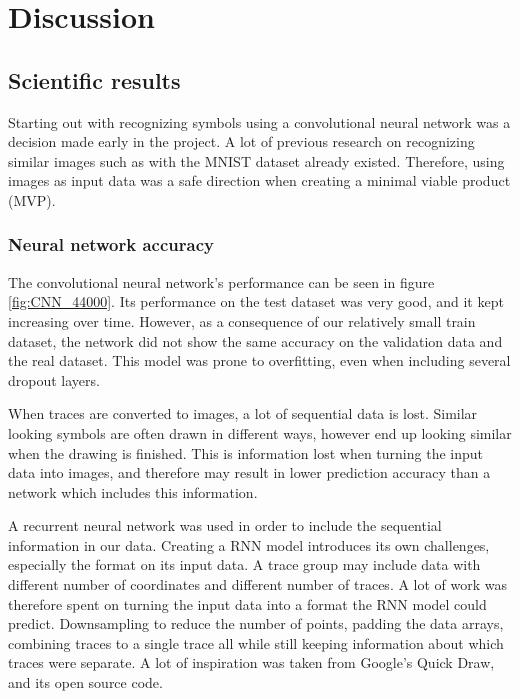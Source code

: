 \chapter{Discussion}

\section{Scientific results}

Starting out with recognizing symbols using a convolutional neural network was a decision made early in the project. A lot of previous research on recognizing similar images such as with the MNIST dataset already existed. Therefore, using images as input data was a safe direction when creating a minimal viable product (MVP).


\subsection{Neural network accuracy}
The convolutional neural network's performance can be seen in figure \ref{fig:CNN_44000}. Its performance on the test dataset was very good, and it kept increasing over time. However, as a consequence of our relatively small train dataset, the network did not show the same accuracy on the validation data and the real dataset. This model was prone to overfitting, even when including several dropout layers. 

When traces are converted to images, a lot of sequential data is lost. Similar looking symbols are often drawn in different ways, however end up looking similar when the drawing is finished. This is information lost when turning the input data into images, and therefore may result in lower prediction accuracy than a network which includes this information.

A recurrent neural network was used in order to include the sequential information in our data. Creating a RNN model introduces its own challenges, especially the format on its input data. A trace group may include data with different number of coordinates and different number of traces. A lot of work was therefore spent on turning the input data into a format the RNN model could predict. Downsampling to reduce the number of points, padding the data arrays, combining traces to a single trace all while still keeping information about which traces were separate. A lot of inspiration was taken from Google's Quick Draw, and its open source code. \cite{_recurrent_2017} 

